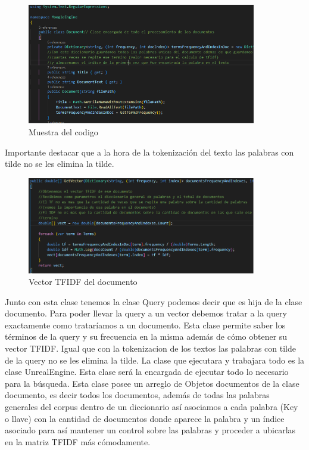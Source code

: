 \documentclass[a4paper,12pt]{article}
\begin{document}
\begin{figure}[h]
    \center
    \includegraphics[width=10cm]{Pictures For Moogle!/Figure1.png}
    \caption{Muestra del codigo}
    \label{fig:logo}
\end{figure}

Importante destacar que a la hora de la tokenización del texto las palabras con tilde no se les elimina la tilde.

\begin{figure}[h]
    \center
    \includegraphics[width=10cm]{Pictures For Moogle!/Figure2.png}
    \caption{Vector TFIDF del documento}
    \label{fig:logo}
\end{figure}

Junto con esta clase tenemos la clase Query podemos decir que es hija de la clase documento. Para poder llevar la query a un vector debemos tratar a la query exactamente como trataríamos a un documento. Esta clase permite saber los términos de la query y su frecuencia en la misma además de cómo obtener su vector TFIDF. Igual que con la tokenizacion de los textos las palabras con tilde de la query no se les elimina la tilde.
La clase que ejecutara y trabajara todo es la clase UnrealEngine. Esta clase será la encargada de ejecutar todo lo necesario para la búsqueda. Esta clase posee un arreglo de Objetos documentos de la clase documento, es decir todos los documentos, además de todas las palabras generales del corpus dentro de un diccionario así asociamos a cada palabra (Key o llave) con la cantidad de documentos donde aparece la palabra  y un índice asociado para así mantener un control sobre las palabras y proceder a ubicarlas en la matriz TFIDF más cómodamente. 
\end{document}
